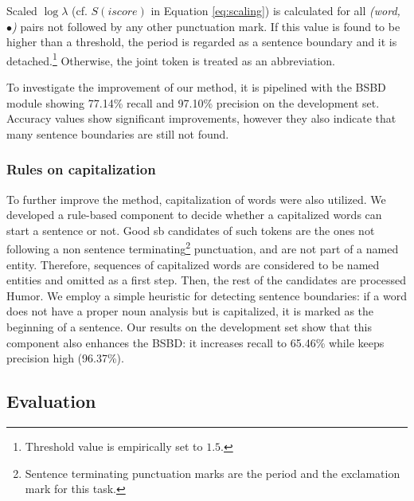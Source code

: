 Scaled $\log \lambda$ (cf. $S(iscore)$ in Equation \ref{eq:scaling}) is calculated for all \emph{(word, $\bullet$)} pairs not followed by any other punctuation mark. 
If this value is found to be higher than a threshold, the period is regarded as a sentence boundary and it is detached.\footnote{Threshold value is empirically set to $1.5$.} 
Otherwise, the joint token is treated as an abbreviation.

To investigate the improvement of our method, it is pipelined with the BSBD module showing 77.14\% recall and 97.10\% precision on the development set. 
Accuracy values show significant improvements, however they also indicate that many sentence boundaries are still not found.

\subsubsection{Rules on capitalization}

To further improve the method, capitalization of words were also utilized. 
We developed a rule-based component to decide whether a capitalized words can start a sentence or not.
Good \acrshort{sb} candidates of such tokens are the ones not following a non sentence terminating\footnote{Sentence terminating punctuation marks are the period and the exclamation mark for this task.} punctuation, and are not part of a named entity. 
Therefore, sequences of capitalized words are considered to be named entities and omitted as a first step. 
Then, the rest of the candidates are processed Humor.
We employ a simple heuristic for detecting sentence boundaries:
if a word does not have a proper noun analysis but is capitalized, it is marked as the beginning of a sentence.  
Our results on the development set show that this component also enhances the BSBD: it increases recall to 65.46\% while keeps precision high (96.37\%). 

\subsection{Evaluation}


